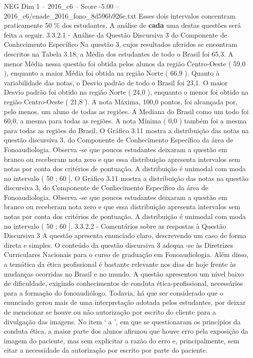 \begin{textsample}{NEG Dim 1 – 2016\_c6 – Score -5.00 – 2016\_c6/enade\_2016\_fono\_8d596b926e.txt}
Esses dois intervalos concentram praticamente 50 \% dos estudantes.
A análise de \textbf{cada} uma destas questões será feita a seguir. 3.3.2.1 - Análise da Questão Discursiva 3 do Componente de Conhecimento Específico Na questão 3, cujos resultados aferidos se encontram descritos na Tabela 3.18, a Média dos estudantes de todo o Brasil foi 65,3.
A menor Média nessa questão foi obtida pelos alunos da região Centro-Oeste ( 59,0 ), enquanto a maior Média foi obtida na região Norte ( 66,9 ).
Quanto à variabilidade das notas, o Desvio padrão de todo o Brasil foi 23,1.
O maior Desvio padrão foi obtido na região Norte ( 24,0 ), enquanto o menor foi obtido na região Centro-Oeste ( 21,8 ).
A nota Máxima, 100,0 pontos, foi alcançada por, pelo menos, um aluno de todas as regiões.
A Mediana do Brasil como um todo foi 60,0, a mesma para todas as regiões.
A nota Mínima ( 0,0 ) também foi a mesma para todas as regiões do Brasil.
O Gráfico 3.11 mostra a distribuição das notas na questão discursiva 3, do Componente de Conhecimento Específico da área de Fonoaudiologia.
Observa -se que poucos estudantes deixaram a questão em branco ou receberam nota zero e que essa distribuição apresenta intervalos sem notas por conta dos critérios de pontuação.
A distribuição é unimodal com moda no intervalo ( 50 ; 60 ].
O Gráfico 3.11 mostra a distribuição das notas na questão discursiva 3, do Componente de Conhecimento Específico da área de Fonoaudiologia.
Observa -se que poucos estudantes deixaram a questão em branco ou receberam nota zero e que essa distribuição apresenta intervalos sem notas por conta dos critérios de pontuação.
A distribuição é unimodal com moda no intervalo ( 50 ; 60 ]. 3.3.2.2 - Comentários sobre as respostas à Questão Discursiva 3 A questão apresenta enunciado claro, descrevendo um caso de forma direta e simples.
O conteúdo da questão discursiva 3 adequa -se às Diretrizes Curriculares Nacionais para o curso de graduação em Fonoaudiologia.
Além disso, a temática da ética profissional é bastante relevante nos dias de hoje frente às mudanças ocorridas no Brasil e no mundo.
A questão apresentou um nível baixo de dificuldade, exigindo conhecimentos de conduta ética-profissional, necessários para a formação do fonoaudiólogo.
Todavia, há que ser considerado que o enunciado gerou mais de uma interpretação adotada pelos estudantes, por deixar de mencionar se houve ou não autorização por escrito do cliente para a divulgação das imagens.
No item ‘ a ’, em que se questionaram os princípios da conduta ética, a maior parte dos alunos afirmou que houve erro pela exposição da imagem do paciente, mas sem explicitar a razão do erro e, principalmente, sem citar a necessidade da autorização por escrito por parte do paciente.

\end{textsample}
